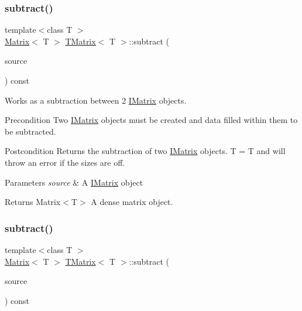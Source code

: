 \subsubsection{\texorpdfstring{subtract()}{subtract()}\hspace{0.1cm}{\footnotesize\ttfamily [4/6]}}
{\footnotesize\ttfamily template$<$class T $>$ \\
\mbox{\hyperlink{class_matrix}{Matrix}}$<$ T $>$ \mbox{\hyperlink{class_t_matrix}{T\+Matrix}}$<$ T $>$\+::subtract (\begin{DoxyParamCaption}\item[{const \mbox{\hyperlink{class_i_matrix}{I\+Matrix}}$<$ \mbox{\hyperlink{class_u_matrix}{U\+Matrix}}$<$ T $>$, T $>$ \&}]{source }\end{DoxyParamCaption}) const}



Works as a subtraction between 2 \mbox{\hyperlink{class_i_matrix}{I\+Matrix}} objects. 

\begin{DoxyPrecond}{Precondition}
Two \mbox{\hyperlink{class_i_matrix}{I\+Matrix}} objects must be created and data filled within them to be subtracted. 
\end{DoxyPrecond}
\begin{DoxyPostcond}{Postcondition}
Returns the subtraction of two \mbox{\hyperlink{class_i_matrix}{I\+Matrix}} objects. T = T and will throw an error if the sizes are off.
\end{DoxyPostcond}

\begin{DoxyParams}{Parameters}
{\em source} & A \mbox{\hyperlink{class_i_matrix}{I\+Matrix}} object \\
\hline
\end{DoxyParams}
\begin{DoxyReturn}{Returns}
Matrix$<$\+T$>$ A dense matrix object. 
\end{DoxyReturn}
\mbox{\label{class_t_matrix_a85ba2381683bdb64de89e79f05b77ff4}} 
\subsubsection{\texorpdfstring{subtract()}{subtract()}\hspace{0.1cm}{\footnotesize\ttfamily [5/6]}}
{\footnotesize\ttfamily template$<$class T $>$ \\
\mbox{\hyperlink{class_matrix}{Matrix}}$<$ T $>$ \mbox{\hyperlink{class_t_matrix}{T\+Matrix}}$<$ T $>$\+::subtract (\begin{DoxyParamCaption}\item[{const \mbox{\hyperlink{class_i_matrix}{I\+Matrix}}$<$ \mbox{\hyperlink{class_s_matrix}{S\+Matrix}}$<$ T $>$, T $>$ \&}]{source }\end{DoxyParamCaption}) const}



